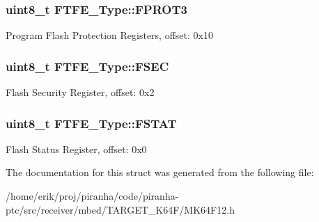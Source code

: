 \subsubsection[{\texorpdfstring{F\+P\+R\+O\+T3}{FPROT3}}]{ uint8\+\_\+t F\+T\+F\+E\+\_\+\+Type\+::\+F\+P\+R\+O\+T3}\hypertarget{structFTFE__Type_a843a1cb7ca8c41892fcedc3d4c16e743}{}\label{structFTFE__Type_a843a1cb7ca8c41892fcedc3d4c16e743}
Program Flash Protection Registers, offset\+: 0x10 
\subsubsection[{\texorpdfstring{F\+S\+EC}{FSEC}}]{ uint8\+\_\+t F\+T\+F\+E\+\_\+\+Type\+::\+F\+S\+EC}\hypertarget{structFTFE__Type_a847ed6979efb70e72ff11cac48e8f675}{}\label{structFTFE__Type_a847ed6979efb70e72ff11cac48e8f675}
Flash Security Register, offset\+: 0x2 
\subsubsection[{\texorpdfstring{F\+S\+T\+AT}{FSTAT}}]{ uint8\+\_\+t F\+T\+F\+E\+\_\+\+Type\+::\+F\+S\+T\+AT}\hypertarget{structFTFE__Type_a2bb1265d087542796f71842efcb496ce}{}\label{structFTFE__Type_a2bb1265d087542796f71842efcb496ce}
Flash Status Register, offset\+: 0x0 

The documentation for this struct was generated from the following file\+:\begin{DoxyCompactItemize}
\item 
/home/erik/proj/piranha/code/piranha-\/ptc/src/receiver/mbed/\+T\+A\+R\+G\+E\+T\+\_\+\+K64\+F/M\+K64\+F12.\+h\end{DoxyCompactItemize}
